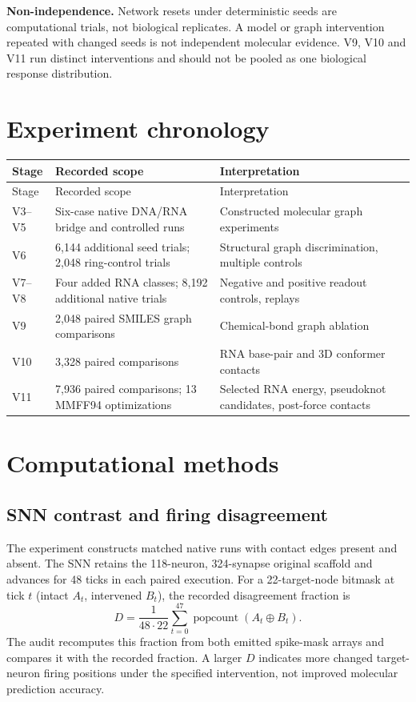 \documentclass[11pt,a4paper]{article}
\begin{document}
\textbf{Non-independence.} Network resets under deterministic seeds are computational trials, not biological replicates. A model or graph intervention repeated with changed seeds is not independent molecular evidence. V9, V10 and V11 run distinct interventions and should not be pooled as one biological response distribution.

\section{Experiment chronology}

\begin{center}\small\begin{longtable}{lll}
\toprule
Stage & Recorded scope & Interpretation\\
\midrule
\endfirsthead
\toprule
Stage & Recorded scope & Interpretation\\
\midrule
\endhead
V3--V5 & Six-case native DNA/RNA bridge and controlled runs & Constructed molecular graph experiments\\
V6 & 6,144 additional seed trials; 2,048 ring-control trials & Structural graph discrimination, multiple controls\\
V7--V8 & Four added RNA classes; 8,192 additional native trials & Negative and positive readout controls, replays\\
V9 & 2,048 paired SMILES graph comparisons & Chemical-bond graph ablation\\
V10 & 3,328 paired comparisons & RNA base-pair and 3D conformer contacts\\
V11 & 7,936 paired comparisons; 13 MMFF94 optimizations & Selected RNA energy, pseudoknot candidates, post-force contacts\\
\bottomrule
\end{longtable}
\end{center}
\section{Computational methods}
\subsection{SNN contrast and firing disagreement}
The experiment constructs matched native runs with contact edges present and absent. The SNN retains the 118-neuron, 324-synapse original scaffold and advances for 48 ticks in each paired execution. For a 22-target-node bitmask at tick $t$ (intact $A_t$, intervened $B_t$), the recorded disagreement fraction is
\begin{equation}
D=\frac{1}{48\cdot22}\sum_{t=0}^{47}\operatorname{popcount}(A_t\oplus B_t).
\end{equation}
The audit recomputes this fraction from both emitted spike-mask arrays and compares it with the recorded fraction. A larger $D$ indicates more changed target-neuron firing positions under the specified intervention, not improved molecular prediction accuracy.
\end{document}
